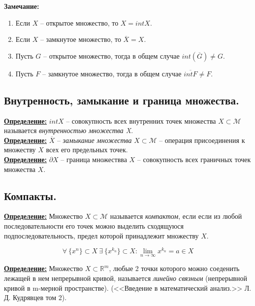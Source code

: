 \documentclass[a4paper,12pt]{article} %
\begin{document}
\textbf{Замечание:}

\begin{enumerate}
    \item Если $X$ -- открытое множество, то $X = int X$.
    \item Если $X$ -- замкнутое множество, то $\overline{X} = X$.
    \item Пусть $G$ -- открытое множество, тогда в общем случае $int(\overline{G}) \neq G$.
    \item Пусть $F$ -- замкнутое множество, тогда в общем случае $\overline{int F} \neq F$.\\
\end{enumerate}

\subsection{Внутренность, замыкание и граница множества.}

\underline{\textbf{Определение:}} $int X$ -- совокупность всех внутренних точек множества $X \subset \mathscr{M}$ называется \textit{внутренностью множества X}.\\

\underline{\textbf{Определение:}} $\overline X$ -- \textit{замыкание множества} $X \subset \mathscr{M}$ -- операция присоединения к множеству $X$ всех его предельных точек.\\

\underline{\textbf{Определение:}} $\partial X$ -- граница множествва $X$ -- совокупность всех граничных точек множества $X$.\\

\subsection{Компакты.}

\underline{\textbf{Определение:}} Множество $X \subset \mathscr{M}$ называется \textit{компактом}, если если из любой последовательности его точек можно выделить сходящуюся подпоследовательность, предел которой принадлежит множеству $X$.

\[ \forall ~ \{x^n \} \subset X ~ \exists ~ \{x^{k_n} \} \subset X : \lim\limits_{n \to \infty} x^{k_n} = a \in X \]

\underline{\textbf{Определение:}} Множество $X \subset \mathbb{R}^m$, любые 2 точки которого можно соеденить лежащей в нем непрерывной кривой, называется \textit{линейно связным} (непрерывной кривой в m-мерной пространстве). (<<Введение в математический анализ.>> Л. Д. Кудрявцев том 2).\\
\end{document}
